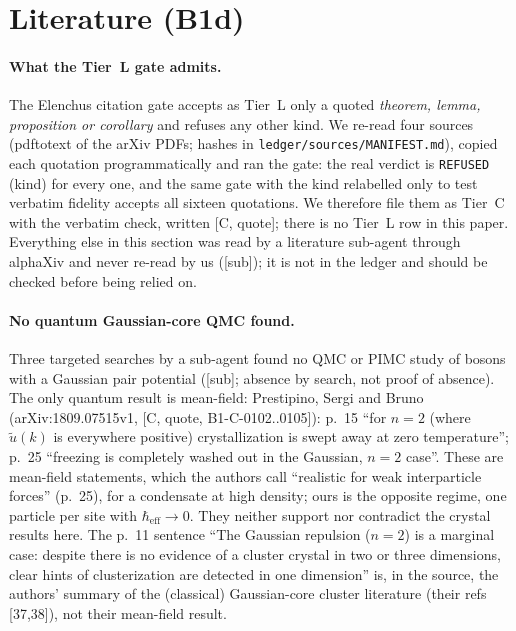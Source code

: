 \documentclass[10pt]{article}
\newcommand{\tier}[1]{\textsf{[#1]}}
\newcommand{\sub}{\textsf{[sub]}}
\newcommand{\hb}{\hbar_{\mathrm{eff}}}
\begin{document}
\section{Literature (B1d)}\label{sec:lit}
\paragraph{What the Tier~L gate admits.} The Elenchus citation gate accepts as Tier~L only a quoted \emph{theorem, lemma, proposition or corollary} and refuses any other kind. We re-read four sources (pdftotext of the arXiv PDFs; hashes in \texttt{ledger/sources/MANIFEST.md}), copied each quotation programmatically and ran the gate:
the real verdict is \texttt{REFUSED} (kind) for every one, and the same gate with the kind relabelled only to test verbatim fidelity accepts all sixteen quotations. We therefore file them as Tier~C with the verbatim check, written \tier{C, quote}; there is no Tier~L row in this paper. Everything else in this section was read by a literature sub-agent through alphaXiv
and never re-read by us (\sub{}); it is not in the ledger and should be checked before being relied on.
\paragraph{No quantum Gaussian-core QMC found.} Three targeted searches by a sub-agent found no QMC or PIMC study of bosons with a Gaussian pair potential (\sub; absence by search, not proof of absence). The only quantum result is mean-field: Prestipino, Sergi and Bruno (arXiv:1809.07515v1, \tier{C, quote, B1-C-0102..0105}): p.~15 ``for $n=2$ (where $\tilde u(k)$ is everywhere positive) crystallization is swept away at zero temperature''; p.~25 ``freezing is completely washed out in the Gaussian, $n=2$ case''. These are mean-field statements, which the
authors call ``realistic for weak interparticle forces'' (p.~25), for a condensate at high density; ours is the opposite regime, one particle per site with $\hb\to0$. They neither support nor contradict the crystal results here. The p.~11 sentence ``The Gaussian repulsion ($n=2$) is a marginal case: despite there is no evidence of a cluster crystal in two or three dimensions, clear hints of clusterization are detected in one dimension'' is, in the source, the authors' summary of the (classical) Gaussian-core cluster literature (their refs [37,38]), not their mean-field result.
\end{document}
